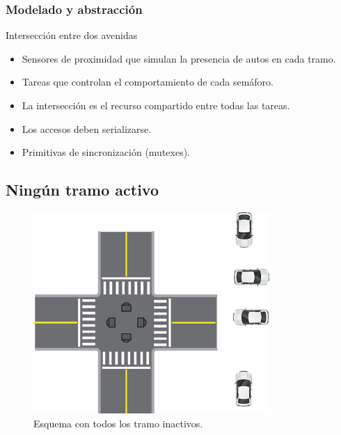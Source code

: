 \begin{frame}
\frametitle{Modelado y abstracción}
\begin{block}{Intersección entre dos avenidas}
	\begin{itemize}
		\item Sensores de proximidad que simulan la presencia de autos en cada tramo.
		\item Tareas que controlan el comportamiento de cada semáforo.
		\item La intersección es el recurso compartido entre todas las tareas.
		\item Los accesos deben serializarse.
		\item Primitivas de sincronización (mutexes).
	\end{itemize}
\end{block}
\end{frame}

\subsection{Ningún tramo activo}
\begin{figure}[htbp]
	\centering
	\includegraphics[width=0.8\textwidth]{diagramas/ningun-activo.eps}
	\caption{Esquema con todos los tramo inactivos.}
	\label{fig:ningun-activo}
\end{figure}

